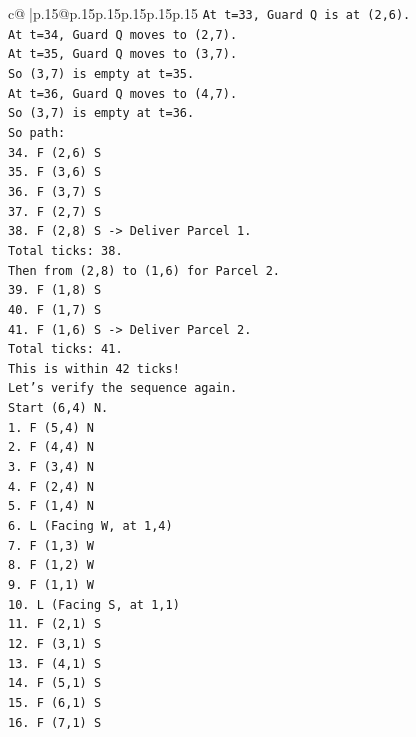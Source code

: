 \documentclass{article}
\begin{document}
{\begin{supertabular}{c@{$\;$}|p{.15\linewidth}@{}p{.15\linewidth}p{.15\linewidth}p{.15\linewidth}p{.15\linewidth}p{.15\linewidth}}
{{{\texttt{At t=33, Guard Q is at (2,6).} \\
\texttt{At t=34, Guard Q moves to (2,7).} \\
\texttt{At t=35, Guard Q moves to (3,7).} \\
\texttt{So (3,7) is empty at t=35.} \\
\texttt{At t=36, Guard Q moves to (4,7).} \\
\texttt{So (3,7) is empty at t=36.} \\
\texttt{So path:} \\
\texttt{34. F (2,6) S} \\
\texttt{35. F (3,6) S} \\
\texttt{36. F (3,7) S} \\
\texttt{37. F (2,7) S} \\
\texttt{38. F (2,8) S {-}> Deliver Parcel 1.} \\
\texttt{Total ticks: 38.} \\
\texttt{Then from (2,8) to (1,6) for Parcel 2.} \\
\texttt{39. F (1,8) S} \\
\texttt{40. F (1,7) S} \\
\texttt{41. F (1,6) S {-}> Deliver Parcel 2.} \\
\texttt{Total ticks: 41.} \\
\texttt{This is within 42 ticks!} \\
\texttt{Let's verify the sequence again.} \\
\texttt{Start (6,4) N.} \\
\texttt{1. F (5,4) N} \\
\texttt{2. F (4,4) N} \\
\texttt{3. F (3,4) N} \\
\texttt{4. F (2,4) N} \\
\texttt{5. F (1,4) N} \\
\texttt{6. L (Facing W, at 1,4)} \\
\texttt{7. F (1,3) W} \\
\texttt{8. F (1,2) W} \\
\texttt{9. F (1,1) W} \\
\texttt{10. L (Facing S, at 1,1)} \\
\texttt{11. F (2,1) S} \\
\texttt{12. F (3,1) S} \\
\texttt{13. F (4,1) S} \\
\texttt{14. F (5,1) S} \\
\texttt{15. F (6,1) S} \\
\texttt{16. F (7,1) S} \\
}}}
\end{supertabular}}
\end{document}
